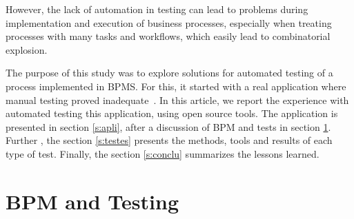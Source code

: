 \documentclass[runningheads,a4paper]{llncs}
\begin{document}
However, the lack of automation in testing can lead to problems during implementation and execution of business processes, especially when treating processes with many tasks and workflows, which easily lead to combinatorial explosion.


The purpose of this study was to explore solutions for automated testing of a process implemented in BPMS. For this, it started with a real application where manual testing proved inadequate~\cite{sbsi2013}. In this article, we report the experience with automated testing this application, using open source tools. The application is presented in section \ref{s:apli}, after a discussion of BPM and tests in section \ref{s:bpmtest}. Further , the section \ref{s:testes} presents the methods, tools and results of each type of test. Finally, the section \ref{s:conclu} summarizes the lessons learned.


\section{BPM and Testing}\label{s:bpmtest}

\end{document}
